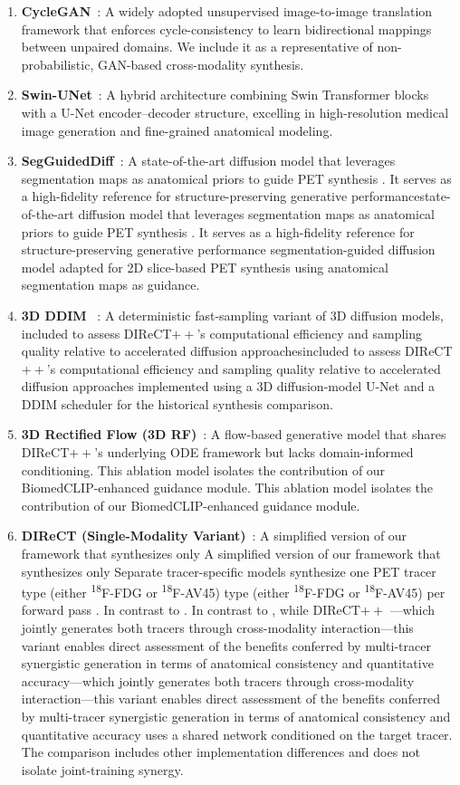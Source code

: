 \documentclass{article}
\providecommand{\DIFaddtex}[1]{{\protect\color{blue} \sf #1}} %
\providecommand{\DIFdeltex}[1]{{\protect\color{red} \ifmmode #1\else\scriptsize #1\fi}} %
\providecommand{\DIFaddbegin}{} %
\providecommand{\DIFaddend}{} %
\providecommand{\DIFdelbegin}{} %
\providecommand{\DIFdelend}{} %
\providecommand{\DIFadd}[1]{\texorpdfstring{\DIFaddtex{#1}}{#1}} %
\providecommand{\DIFdel}[1]{\texorpdfstring{\DIFdeltex{#1}}{}} %
\newcommand{\DIFscaledelfig}{0.5}
\newlength{\DIFdelgraphicswidth} %
\newlength{\DIFdelgraphicsheight} %
\newcommand{\DIFaddincludegraphics}[2][]{{\color{blue}\fbox{\DIFOincludegraphics[#1]{#2}}}} %
\newcommand{\DIFdelincludegraphics}[2][]{%
\sbox{\DIFdelgraphicsbox}{\DIFOincludegraphics[#1]{#2}}%
\settoboxwidth{\DIFdelgraphicswidth}{\DIFdelgraphicsbox} %
\settoboxtotalheight{\DIFdelgraphicsheight}{\DIFdelgraphicsbox} %
\scalebox{\DIFscaledelfig}{%
\parbox[b]{\DIFdelgraphicswidth}{\usebox{\DIFdelgraphicsbox}\\[-\baselineskip] \rule{\DIFdelgraphicswidth}{0em}}\llap{\resizebox{\DIFdelgraphicswidth}{\DIFdelgraphicsheight}{%
\setlength{\unitlength}{\DIFdelgraphicswidth}%
\begin{picture}(1,1)%
\thicklines\linethickness{2pt} %
{\color[rgb]{1,0,0}\put(0,0){\framebox(1,1){}}}%
{\color[rgb]{1,0,0}\put(0,0){\line( 1,1){1}}}%
{\color[rgb]{1,0,0}\put(0,1){\line(1,-1){1}}}%
\end{picture}%
}\hspace*{3pt}}} %
} %
\DeclareRobustCommand{\DIFaddbegin}{\DIFOaddbegin \let\includegraphics\DIFaddincludegraphics} %
\DeclareRobustCommand{\DIFaddend}{\DIFOaddend \let\includegraphics\DIFOincludegraphics} %
\DeclareRobustCommand{\DIFdelbegin}{\DIFOdelbegin \let\includegraphics\DIFdelincludegraphics} %
\DeclareRobustCommand{\DIFdelend}{\DIFOaddend \let\includegraphics\DIFOincludegraphics} %
\begin{document}
\begin{enumerate}
    \item \textbf{CycleGAN}~\cite{zhu2017unpaired}: A widely adopted unsupervised image-to-image translation framework that enforces cycle-consistency to learn bidirectional mappings between unpaired domains. We include it as a representative of non-probabilistic, GAN-based cross-modality synthesis.

    \item \textbf{Swin-UNet}~\cite{Cao2021swin}: A hybrid architecture combining Swin Transformer blocks with a U-Net encoder–decoder structure, excelling in high-resolution medical image generation and fine-grained anatomical modeling.

    \item \textbf{SegGuidedDiff}~\cite{konz2024anatomically}: A \DIFdelbegin \DIFdel{state-of-the-art diffusion model that leverages segmentation maps as anatomical priors to guide PET synthesis . It serves as a high-fidelity reference for structure-preserving generative performance}\DIFdelend \DIFaddbegin \DIFadd{segmentation-guided diffusion model adapted for 2D slice-based PET synthesis using anatomical segmentation maps as guidance}\DIFaddend .

    \item \textbf{3D DDIM}~\DIFdelbegin \DIFdel{\cite{Graf2023}}\DIFdelend \DIFaddbegin \DIFadd{\cite{song2021ddim,pinaya2023generative}}\DIFaddend : A deterministic fast-sampling variant of 3D diffusion models, \DIFdelbegin \DIFdel{included to assess DIReCT$++$’s computational efficiency and sampling quality relative to accelerated diffusion approaches}\DIFdelend \DIFaddbegin \DIFadd{implemented using a 3D diffusion-model U-Net and a DDIM scheduler for the historical synthesis comparison}\DIFaddend .

    \item \textbf{3D Rectified Flow (3D RF)}~\cite{Xing2022}: A flow-based generative model that shares DIReCT$++$’s underlying ODE framework but lacks domain-informed conditioning.
\DIFdelbegin \DIFdel{This ablation model isolates the contribution of our BiomedCLIP-enhanced guidance module.
}\DIFdelend 

    \item \textbf{DIReCT (Single-Modality Variant)}~\cite{liu2025direct}: \DIFdelbegin \DIFdel{A simplified version of our framework that synthesizes only }\DIFdelend \DIFaddbegin \DIFadd{Separate tracer-specific models synthesize }\DIFaddend one PET tracer \DIFdelbegin \DIFdel{type (either \textsuperscript{18}F-FDG or \textsuperscript{18}F-AV45) }\DIFdelend per forward pass\DIFdelbegin \DIFdel{. In contrast to }\DIFdelend \DIFaddbegin \DIFadd{, while }\DIFaddend DIReCT$++$ \DIFdelbegin \DIFdel{—which jointly generates both tracers through cross-modality interaction—this variant enables direct assessment of the benefits conferred by multi-tracer synergistic generation in terms of anatomical consistency and quantitative accuracy}\DIFdelend \DIFaddbegin \DIFadd{uses a shared network conditioned on the target tracer. The comparison includes other implementation differences and does not isolate joint-training synergy}\DIFaddend .
\end{enumerate}
\end{document}
